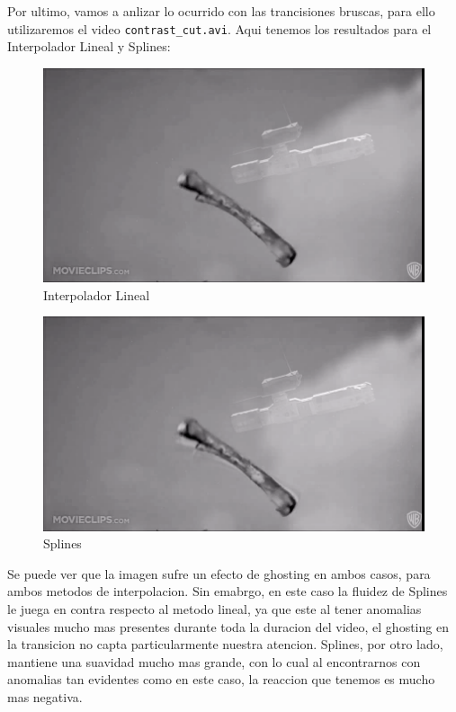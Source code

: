 Por ultimo, vamos a anlizar lo ocurrido con las trancisiones bruscas, para ello utilizaremos el video \texttt{contrast\_cut.avi}. Aqui tenemos los resultados para el Interpolador Lineal y Splines:

\begin{figure}[h]
\centering
  \begin{minipage}[b]{.9\textwidth}
    \includegraphics[width=\textwidth]{imagenes/ccutLineal.png}
    \caption{Interpolador Lineal}
  \end{minipage}
\end{figure}

\newpage

\begin{figure}[h]
\centering
  \begin{minipage}[b]{.9\textwidth}
    \includegraphics[width=\textwidth]{imagenes/ccutSplines.png}
    \caption{Splines}
  \end{minipage}
\end{figure}

Se puede ver que la imagen sufre un efecto de ghosting en ambos casos, para ambos metodos de interpolacion. Sin emabrgo, en este caso la fluidez de Splines le juega en contra respecto al metodo lineal, ya que este al tener anomalias visuales mucho mas presentes durante toda la duracion del video, el ghosting en la transicion no capta particularmente nuestra atencion. Splines, por otro lado, mantiene una suavidad mucho mas grande, con lo cual al encontrarnos con anomalias tan evidentes como en este caso, la reaccion que tenemos es mucho mas negativa.